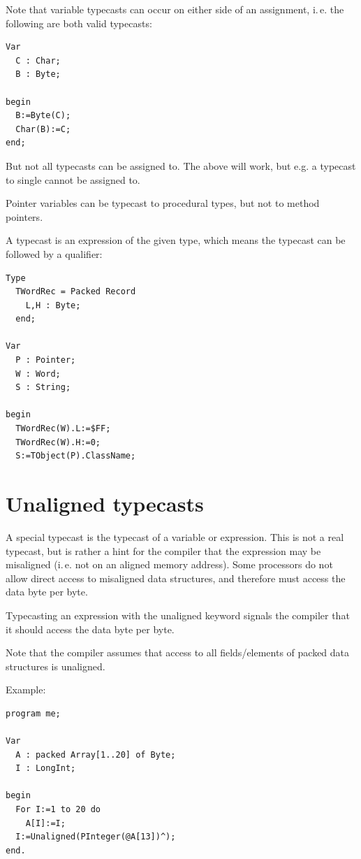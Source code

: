 Note that variable typecasts can occur on either side of an assignment,
i.\,e. the following are both valid typecasts:
\begin{verbatim}
Var
  C : Char;
  B : Byte;

begin
  B:=Byte(C);
  Char(B):=C;
end;
\end{verbatim}
But not all typecasts can be assigned to. The above will work, but e.g. a
typecast to single cannot be assigned to.

Pointer variables can be typecast to procedural types, but not
to method pointers.

A typecast is an expression of the given type, which means the
typecast can be followed by a qualifier:
\begin{verbatim}
Type
  TWordRec = Packed Record
    L,H : Byte;
  end;

Var
  P : Pointer;
  W : Word;
  S : String;

begin
  TWordRec(W).L:=$FF;
  TWordRec(W).H:=0;
  S:=TObject(P).ClassName;
\end{verbatim}

\section{Unaligned typecasts}
A special typecast is the  typecast of a variable or
expression. This is not a real typecast, but is rather a hint for the
compiler that the expression may be misaligned (i.\,e. not on an aligned
memory address). Some processors do not allow direct access to misaligned
data structures, and therefore must access the data byte per byte.

Typecasting an expression with the unaligned keyword signals the compiler
that it should access the data byte per byte.

Note that the compiler assumes that access to all fields/elements of
packed data structures is unaligned.

Example:
\begin{verbatim}
program me;

Var
  A : packed Array[1..20] of Byte;
  I : LongInt;

begin
  For I:=1 to 20 do
    A[I]:=I;
  I:=Unaligned(PInteger(@A[13])^);
end.
\end{verbatim}

